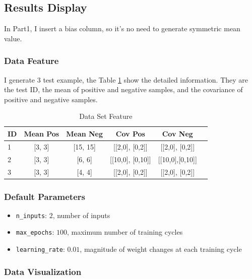 \documentclass{article}
\begin{document}
\subsection{Results Display}

In Part1, I insert a bias column, so it's no need to generate symmetric mean value.

\subsubsection{Data Feature}

I generate 3 test example, the Table \ref{tab:p1feat} show the detailed information. They are the test ID, the mean of positive and negative samples, and the covariance of positive and negative samples.

\begin{table}[!ht]
\centering
\caption{Data Set Feature}
\label{tab:p1feat}
\begin{tabular}{|l|c|c|c|c|c|} \hline
ID & Mean Pos & Mean Neg & Cov Pos & Cov Neg   \\ \hline
1 & [3, 3] & [15, 15] & [[2,0], [0,2]] & [[2,0], [0,2]] \\ \hline
2 &	[3, 3] & [6, 6] & [[10,0], [0,10]] & [[10,0],[0,10]] \\ \hline
3 &	[3, 3] & [4, 4] & [[2,0], [0,2]] & [[2,0], [0,2]] \\ \hline
\end{tabular}
\end{table}

\subsubsection{Default Parameters}

\begin{itemize}
    \item \texttt{n\_inputs}: $2$, number of inputs
    \item \texttt{max\_epochs}: $100$, maximum number of training cycles
    \item \texttt{learning\_rate}: $0.01$, magnitude of weight changes at each training cycle
\end{itemize}

\subsubsection{Data Visualization}
\end{document}
